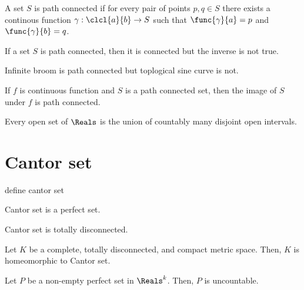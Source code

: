 \begin{definition}
    A set \(S\) is path connected if for every pair of points \(p,q \in S\) there exists a continous function \(\gamma: \clcl{a}{b} \to S\) such that \(\func{\gamma}{a} = p\) and \(\func{\gamma}{b} = q\).
\end{definition}
\begin{theorem}
    If a set \(S\) is path connected, then it is connected but the inverse is not true.
\end{theorem}
\begin{example}
    Infinite broom is path connected but toplogical sine curve is not.
\end{example}
\begin{proposition}
    If \(f\) is continuous function and \(S\) is a path connected set, then the image of \(S\) under \(f\) is path connected.
\end{proposition}
\begin{proposition}
    Every open set of \(\Reals\) is the union of countably many disjoint open intervals.
\end{proposition}

\section{Cantor set}
\begin{definition}
    define cantor set
\end{definition}

\begin{proposition}
    Cantor set is a perfect set.
\end{proposition}

\begin{proposition}
    Cantor set is totally disconnected.
\end{proposition}
\begin{theorem}
    Let \(K\) be a complete, totally disconnected, and compact metric space. Then, \(K\) is homeomorphic to Cantor set.
\end{theorem}

\begin{theorem}
    Let \(P\) be a non-empty perfect set in \(\Reals^k\). Then, \(P\) is uncountable.
\end{theorem}

